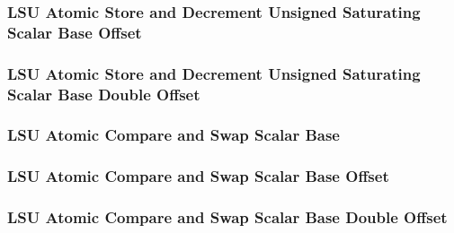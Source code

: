 

\subsubsection[{\small LSU Atomic Store and Decrement Unsigned Saturating Scalar Base Offset}]{LSU Atomic Store and Decrement Unsigned Saturating Scalar Base Offset} \label{sec:format-LSU-ASDUSSB.O}



\subsubsection[{\small LSU Atomic Store and Decrement Unsigned Saturating Scalar Base Double Offset}]{LSU Atomic Store and Decrement Unsigned Saturating Scalar Base Double Offset} \label{sec:format-LSU-ASDUSSB.D}



\subsubsection[{\small LSU Atomic Compare and Swap Scalar Base}]{LSU Atomic Compare and Swap Scalar Base} \label{sec:format-LSU-ACSWAPSB}



\subsubsection[{\small LSU Atomic Compare and Swap Scalar Base Offset}]{LSU Atomic Compare and Swap Scalar Base Offset} \label{sec:format-LSU-ACSWAPSB.O}



\subsubsection[{\small LSU Atomic Compare and Swap Scalar Base Double Offset}]{LSU Atomic Compare and Swap Scalar Base Double Offset} \label{sec:format-LSU-ACSWAPSB.D}

